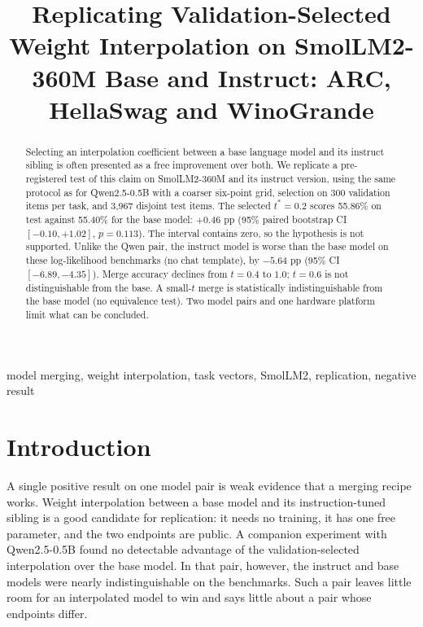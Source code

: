 \documentclass[conference]{IEEEtran}
\begin{document}
\title{Replicating Validation-Selected Weight Interpolation on SmolLM2-360M Base and Instruct: ARC, HellaSwag and WinoGrande}

\author{
}

\maketitle

\begin{abstract}
Selecting an interpolation coefficient between a base language model and its instruct sibling is often presented as a free improvement over both. We replicate a pre-registered test of this claim on SmolLM2-360M and its instruct version, using the same protocol as for Qwen2.5-0.5B with a coarser six-point grid, selection on 300 validation items per task, and 3{,}967 disjoint test items. The selected $t^\ast=0.2$ scores 55.86\% on test against 55.40\% for the base model: $+0.46$ pp (95\% paired bootstrap CI $[-0.10,+1.02]$, $p=0.113$). The interval contains zero, so the hypothesis is not supported. Unlike the Qwen pair, the instruct model is worse than the base model on these log-likelihood benchmarks (no chat template), by $-5.64$ pp (95\% CI $[-6.89,-4.35]$). Merge accuracy declines from $t=0.4$ to $1.0$; $t=0.6$ is not distinguishable from the base. A small-$t$ merge is statistically indistinguishable from the base model (no equivalence test). Two model pairs and one hardware platform limit what can be concluded.
\end{abstract}

\begin{IEEEkeywords}
model merging, weight interpolation, task vectors, SmolLM2, replication, negative result
\end{IEEEkeywords}

\section{Introduction}
A single positive result on one model pair is weak evidence that a merging recipe works. Weight interpolation between a base model and its instruction-tuned sibling is a good candidate for replication: it needs no training, it has one free parameter, and the two endpoints are public. A companion experiment with Qwen2.5-0.5B found no detectable advantage of the validation-selected interpolation over the base model. In that pair, however, the instruct and base models were nearly indistinguishable on the benchmarks. Such a pair leaves little room for an interpolated model to win and says little about a pair whose endpoints differ.
\end{document}
